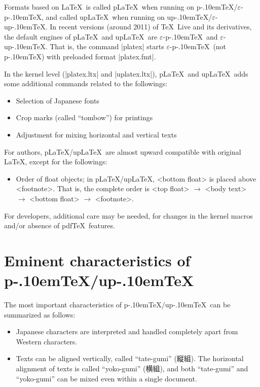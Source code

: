 \documentclass[a4paper,11pt]{article}
\def\epTeX{$\varepsilon$-\pTeX}\def\eTeX{$\varepsilon$-\TeX}
\def\eupTeX{$\varepsilon$-\upTeX}\def\upTeX{u\pTeX}
\def\pTeX{p\kern-.10em\TeX}
\def\pLaTeX{p\LaTeX}\def\upLaTeX{u\pLaTeX}
\def\pdfTeX{pdf\TeX}
\begin{document}
Formats based on \LaTeX\ is called \pLaTeX\ when running on \pTeX/\epTeX,
and called \upLaTeX\ when running on \upTeX/\eupTeX.
In recent versions (around 2011) of \TeX\ Live and its derivatives,
the default engines of \pLaTeX\ and \upLaTeX\ are \epTeX\ and \eupTeX.
That is, the command |platex| starts \epTeX\ (not \pTeX) with
preloaded format |platex.fmt|.

In the kernel level (|platex.ltx| and |uplatex.ltx|),
\pLaTeX\ and \upLaTeX\ adds some additional commands
related to the followings:
\begin{itemize}
  \item Selection of Japanese fonts
  \item Crop marks (called ``tombow'') for printings
  \item Adjustment for mixing horizontal and vertical texts
\end{itemize}
For authors, \pLaTeX/\upLaTeX\ are almost upward compatible with
original \LaTeX, except for the followings:
\begin{itemize}
  \item Order of float objects; in \pLaTeX/\upLaTeX,
    <bottom float> is placed above <footnote>.
    That is, the complete order is
    <top float> $\rightarrow$ <body text> $\rightarrow$
    <bottom float> $\rightarrow$ <footnote>.
\end{itemize}
For developers, additional care may be needed,
for changes in the kernel macros and/or absence of \pdfTeX\ features.

\section{Eminent characteristics of \pTeX/\upTeX}

The most important characteristics of \pTeX/\upTeX\ can be
summarized as follows:
\begin{itemize}
  \item Japanese characters are interpreted and handled completely apart from
    Western characters.
  \item Texts can be aligned vertically, called ``tate-gumi'' (縦組).
    The horizontal alignment of texts is called ``yoko-gumi'' (横組),
    and both ``tate-gumi'' and ``yoko-gumi'' can be mixed
    even within a single document.
\end{itemize}
\end{document}
